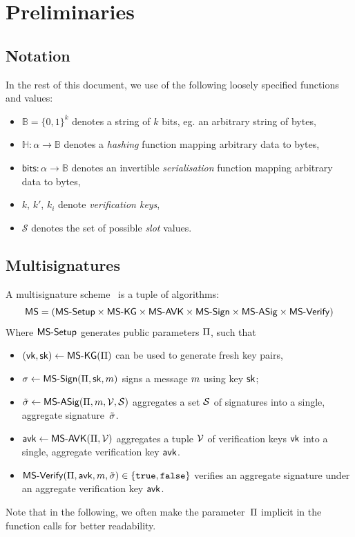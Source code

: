 \section{Preliminaries}\label{sec:prel}

\subsection{Notation}

In the rest of this document, we use of the following loosely specified functions and values: 
\begin{itemize}
   \item  $\mathbb{B} = \{0,1\}^k$ denotes a string of $k$ bits, eg. an arbitrary string of bytes, 
    \item $\mathbb{H} : \alpha \to \mathbb{B}$ denotes a \emph{hashing} function mapping arbitrary data to bytes, 
    \item $\mathsf{bits} : \alpha \to \mathbb{B}$ denotes an invertible \emph{serialisation} function mapping arbitrary data to bytes, 
    \item $k$, $k'$, $k_i$ denote \emph{verification keys},
   \item  $\mathcal{S}$ denotes the set of possible \emph{slot} values. 
\end{itemize}

\subsection{Multisignatures}\label{sec:multisig}

A multisignature scheme~\cite{itakura1983public,CCS:MicOhtRey01} is a
tuple of algorithms:
$$
\mathsf{MS} = (\mathsf{MS\textsf{-}{}Setup} \times \allowbreak\mathsf{MS\textsf{-}{}KG} \times \allowbreak\mathsf{MS\textsf{-}{}AVK} \times \allowbreak
\mathsf{MS\textsf{-}{}Sign} \times \allowbreak\mathsf{MS\textsf{-}{}ASig} \times \allowbreak\mathsf{MS\textsf{-}{}Verify})
$$
Where $\mathsf{MS\textsf{-}{}Setup}$ generates public parameters $\Pi$, such that
\begin{itemize}
  \item $(\mathsf{vk},\mathsf{sk}) \gets \mathsf{MS\textsf{-}{}KG}(\Pi)$ can be used to generate fresh key pairs,
  \item $\sigma \gets \mathsf{MS\textsf{-}{}Sign}(\Pi,\mathsf{sk},m)$ signs  a message $m$ using key $\mathsf{sk}$;
  \item $\tilde \sigma \gets \mathsf{MS\textsf{-}{}ASig}(\Pi,m,\mathcal V,\mathcal S)$ aggregates  a
    set $\mathcal S$ of signatures into a single, aggregate signature~$\tilde \sigma$.
  \item $\mathsf{avk} \gets \mathsf{MS\textsf{-}{}AVK}(\Pi,\mathcal V)$ aggregates
  a tuple $\mathcal V$ of verification keys $\mathsf{vk}$ into a single,
  aggregate verification key $\mathsf{avk}$.
  \item $\mathsf{MS\textsf{-}{}Verify}(\Pi,\mathsf{avk},m,\tilde \sigma) \in \{\mathtt{true},\mathtt{false}\}$ verifies an aggregate signature under an aggregate verification key $\mathsf{avk}$.
\end{itemize}
Note that in the following, we often make the parameter~$\Pi$ implicit in the function calls for better readability.

